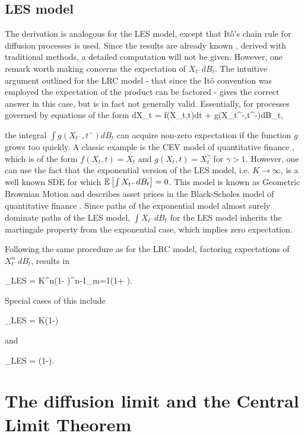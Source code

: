 \subsection{LES model}
The derivation is analogous for the LES model, except that It\^{o}'s chain rule for diffusion processes is used.  Since the results are already known \cite{engen2000}, derived with traditional methods, a detailed computation will not be given.  However, one remark worth making concerns the expectation of $X_{t^-}dB_t$.  The intuitive argument outlined for the LRC model - that since the It\^{o} convention was employed the expectation of the product can be factored - gives the correct answer in this case, but is in fact not generally valid.  Essentially, for processes governed by equations of the form 
\be
dX_t = f(X_t,t)dt + g(X_{t^-},t^-)dB_t,
\ee

\noindent the integral $\int g(X_{t^-},t^-)dB_t$ can acquire non-zero expectation if the function $g$ grows too quickly.  A classic example is the CEV model of quantitative finance \cite{linetsky2010constant}, which is of the form $f(X_t,t) = X_t$ and $g(X_t,t) = X^{\gamma}_t$ for $\gamma > 1$.  However, one can use the fact that the exponential version of the LES model, i.e. $K \to \infty$, is a well known SDE for which $\mathbb{E}\left[\int X_{t^-}dB_t\right]=0$.  This model is known as Geometric Brownian Motion and describes asset prices in the Black-Scholes model of quantitative finance \cite{linetsky2010constant}.  Since paths of the exponential model almost surely dominate paths of the LES model, $\int X_{t^-}dB_t$ for the LES model inherits the martingale property from the exponential case, which implies zero expectation.

Following the same procedure as for the LRC model, factoring expectations of $X^n_{t^-}dB_t$, results in

\be
\expec[X^n]_{LES} = K^{n}\left(1- \right)\prod^{n-1}_{m=1}\left(1+ \right).
\ee

\noindent Special cases of this include

\be
\expec[X]_{LES} = K\left(1-\right)
\ee

\noindent and

\be
\Var[X]_{LES} = \left(1-\right).
\ee



\section{The diffusion limit and the Central Limit Theorem}

